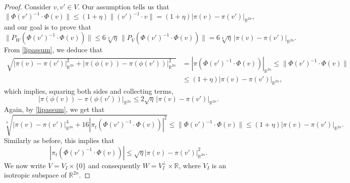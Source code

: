 \documentclass[12pt]{amsart}
\newcommand{\R}{\mathbb R}
\renewcommand{\H}{\mathbb H}
\numberwithin{equation}{section}
\theoremstyle{plain}
\theoremstyle{definition}
\theoremstyle{remark}
\begin{document}
    \begin{proof}
Consider $v,v'\in V$. Our assumption tells us that \begin{equation}\label{lipassum}\|\Phi(v')^{-1}\cdot\Phi(v)\|\leq (1+\eta)\|(v')^{-1}\cdot v\|=(1+\eta)|\pi(v)-\pi(v')|_{\R^{2n}},\end{equation}
and our goal is to prove that
\begin{equation}\label{lipgoal}\|P_W(\Phi(v')^{-1}\cdot \Phi(v))\|\leq 6\sqrt[4]{\eta}\,\|P_V(\Phi(v')^{-1}\cdot \Phi(v))\|=6\sqrt[4]{\eta}\,|\pi(v)-\pi(v')|_{\R^{2n}}.\end{equation}
From \eqref{lipassum}, we deduce that 
\[\begin{split}\sqrt{|\pi(v)-\pi(v')|^2_{\R^{2n}}+|\pi(\phi(v))-\pi(\phi(v'))|^2_{\R^{2n}}}&=|\pi(\Phi(v')^{-1}\cdot\Phi(v))|_{\R^{2n}}\leq \|\Phi(v')^{-1}\cdot\Phi(v)\|\\ &\leq (1+\eta)|\pi(v)-\pi(v')|_{\R^{2n}},\end{split}\]
which implies, squaring both sides and collecting terms,
\begin{equation}\label{1ineq}|\pi(\phi(v))-\pi(\phi(v'))|_{\R^{2n}}\leq 2\sqrt{\eta}\,|\pi(v)-\pi(v')|_{\R^{2n}}.\end{equation}
Again, by \eqref{lipassum}, we get that
\[\sqrt[4]{|\pi(v)-\pi(v')|_{\R^{2n}}^4+16|\pi_t(\Phi(v')^{-1}\cdot \Phi(v))|^2}\leq \|\Phi(v')^{-1}\cdot\Phi(v)\|\leq (1+\eta)|\pi(v)-\pi(v')|_{\R^{2n}}.\]
Similarly as before, this implies that 
\begin{equation}\label{2ineq}
|\pi_t(\Phi(v')^{-1}\cdot \Phi(v))|\leq \sqrt\eta|\pi(v)-\pi(v')|_{\R^{2n}}^2.
\end{equation}
We now write $V=V_I\times \{0\}$ and consequently $W=V_I^\perp\times\R$, where $V_I$ is an isotropic subspace of $\R^{2n}$. %

\end{proof}
\end{document}
